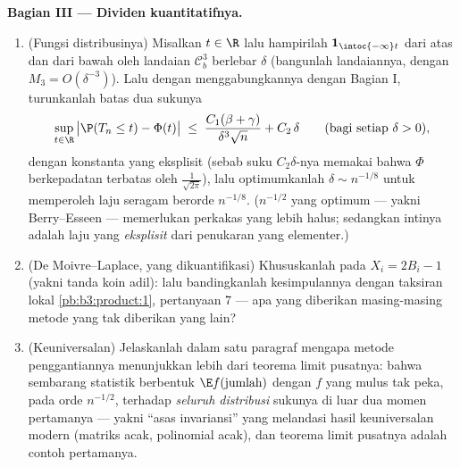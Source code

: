 \begin{problem}
\medskip
\noindent\textbf{Bagian III --- Dividen kuantitatifnya.}
\begin{enumerate}[resume]
  \item (Fungsi distribusinya) Misalkan $t \in \R$ lalu
        hampirilah $\mathbf 1_{\intoc{-\infty}t}$ dari atas dan
        dari bawah oleh landaian $\mathcal C^3_b$ berlebar $\delta$
        (bangunlah landaiannya, dengan $M_3 = O(\delta^{-3})$).
        Lalu dengan menggabungkannya dengan Bagian I, turunkanlah batas dua sukunya
        \[
        \sup_{t\in\R}\,\bigl|\P(T_n \leq t) -
        \Phi(t)\bigr| \;\leq\;
        \frac{C_1(\beta + \gamma)}{\delta^3\sqrt n} +
        C_2\,\delta
        \qquad (\text{bagi setiap } \delta > 0),
        \]
        dengan konstanta yang eksplisit (sebab suku $C_2\delta$-nya memakai
        bahwa $\Phi$ berkepadatan terbatas oleh
        $\frac1{\sqrt{2\pi}}$), lalu optimumkanlah $\delta \sim
        n^{-1/8}$ untuk memperoleh laju seragam berorde
        $n^{-1/8}$.
        ($n^{-1/2}$ yang optimum --- yakni Berry--Esseen ---
        memerlukan perkakas yang lebih halus; sedangkan intinya adalah
        laju yang \emph{eksplisit} dari penukaran yang elementer.)
  \item (De Moivre--Laplace, yang dikuantifikasi) Khususkanlah pada
        $X_i = 2B_i - 1$ (yakni tanda koin adil): lalu bandingkanlah
        kesimpulannya dengan taksiran lokal
        \cref{pb:b3:product:1}, pertanyaan 7 --- apa yang diberikan
        masing-masing metode yang tak diberikan yang lain?
  \item (Keuniversalan) Jelaskanlah dalam satu paragraf mengapa
        metode penggantiannya menunjukkan lebih dari teorema limit pusatnya: bahwa
        sembarang statistik berbentuk $\E f(\text{jumlah})$ dengan $f$ yang
        mulus tak peka, pada orde $n^{-1/2}$, terhadap
        \emph{seluruh distribusi} sukunya di luar dua momen
        pertamanya --- yakni ``asas invariansi'' yang
        melandasi hasil keuniversalan modern (matriks acak,
        polinomial acak), dan teorema limit pusatnya adalah
        contoh pertamanya.
\end{enumerate}


\end{problem}

